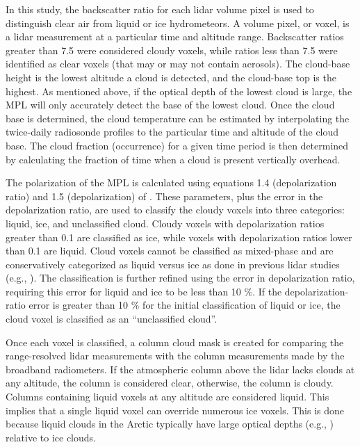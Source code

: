 In this study, the backscatter ratio for each lidar volume pixel is used to distinguish clear air from liquid or ice hydrometeors. A volume pixel, or voxel, is a lidar measurement at a particular time and altitude range. Backscatter ratios greater than 7.5 were considered cloudy voxels, while ratios less than 7.5 were identified as clear voxels (that may or may not contain aerosols). The cloud-base height is the lowest altitude a cloud is detected, and the cloud-base top is the highest. As mentioned above, if the optical depth of the lowest cloud is large, the MPL will only accurately detect the base of the lowest cloud. Once the cloud base is determined, the cloud temperature can be estimated by interpolating the twice-daily radiosonde profiles to the particular time and altitude of the cloud base. The cloud fraction (occurrence) for a given time period is then determined by calculating the fraction of time when a cloud is present vertically overhead.

The polarization of the MPL is calculated using equations 1.4 (depolarization ratio) and 1.5 (depolarization) of \citet{flynn:2007}. These parameters, plus the error in the depolarization ratio, are used to classify the cloudy voxels into three categories: liquid, ice, and unclassified cloud. Cloudy voxels with depolarization ratios greater than 0.1 are classified as ice, while voxels with depolarization ratios lower than 0.1 are liquid. Cloud voxels cannot be classified as mixed-phase and are conservatively categorized as liquid versus ice as done in previous lidar studies (e.g., \citet{intrieri:2002}). The classification is further refined using the error in depolarization ratio, requiring this error for liquid and ice to be less than 10 $\%$. If the depolarization-ratio error is greater than 10 $\%$ for the initial classification of liquid or ice, the cloud voxel is classified as an “unclassified cloud”. 

Once each voxel is classified, a column cloud mask is created for comparing the range-resolved lidar measurements with the column measurements made by the broadband radiometers. If the atmospheric column above the lidar lacks clouds at any altitude, the column is considered clear, otherwise, the column is cloudy. Columns containing liquid voxels at any altitude are considered liquid. This implies that a single liquid voxel can override numerous ice voxels. This is done because liquid clouds in the Arctic typically have large optical depths (e.g., \citet{curry:1996}) relative to ice clouds.

